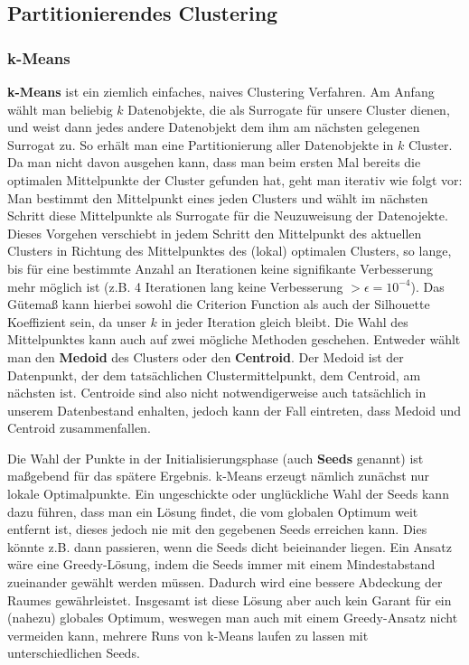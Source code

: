 \subsection{Partitionierendes Clustering}
\subsubsection{k-Means}
\textbf{k-Means} ist ein ziemlich einfaches, naives Clustering
Verfahren. Am Anfang wählt man beliebig \(k\) Datenobjekte,
die als Surrogate für unsere Cluster dienen, und weist dann jedes
andere Datenobjekt dem ihm am nächsten gelegenen Surrogat zu.
So erhält man eine Partitionierung aller Datenobjekte in \(k\) 
Cluster. Da man nicht davon ausgehen kann, dass man beim ersten
Mal bereits die optimalen Mittelpunkte der Cluster gefunden hat,
geht man iterativ wie folgt vor: Man bestimmt den Mittelpunkt eines
jeden Clusters und wählt im nächsten Schritt diese Mittelpunkte als
Surrogate für die Neuzuweisung der Datenojekte. Dieses Vorgehen
verschiebt in jedem Schritt den Mittelpunkt des aktuellen Clusters
in Richtung des Mittelpunktes des (lokal) optimalen Clusters, so lange,
bis für eine bestimmte Anzahl an Iterationen keine signifikante 
Verbesserung mehr möglich ist (z.B. 4 Iterationen lang keine
Verbesserung \(> \epsilon = 10^{-4}\)). Das Gütemaß kann
hierbei sowohl die Criterion Function als auch der Silhouette Koeffizient
sein, da unser \(k\) in jeder Iteration gleich bleibt. Die Wahl des
Mittelpunktes kann auch auf zwei mögliche Methoden geschehen.
Entweder wählt man den \textbf{Medoid} des Clusters oder den
\textbf{Centroid}. Der Medoid ist der Datenpunkt, der dem 
tatsächlichen Clustermittelpunkt, dem Centroid, am nächsten ist.
Centroide sind also nicht notwendigerweise auch tatsächlich in unserem
Datenbestand enhalten, jedoch kann der Fall eintreten, dass Medoid 
und Centroid zusammenfallen.

Die Wahl der Punkte in der Initialisierungsphase (auch \textbf{Seeds}
genannt) ist maßgebend für das spätere Ergebnis. k-Means erzeugt
nämlich zunächst nur lokale Optimalpunkte. Ein ungeschickte oder
unglückliche Wahl der Seeds kann dazu führen, dass man ein Lösung
findet, die vom globalen Optimum weit entfernt ist, dieses jedoch
nie mit den gegebenen Seeds erreichen kann. Dies könnte z.B. dann passieren, 
wenn die Seeds dicht beieinander liegen. Ein Ansatz wäre
eine Greedy-Lösung, indem die Seeds immer mit einem Mindestabstand
zueinander gewählt werden müssen. Dadurch wird eine bessere 
Abdeckung der Raumes gewährleistet. Insgesamt ist diese Lösung aber
auch kein Garant für ein (nahezu) globales Optimum, weswegen man
auch mit einem Greedy-Ansatz nicht vermeiden kann, mehrere Runs
von k-Means laufen zu lassen mit unterschiedlichen Seeds.

